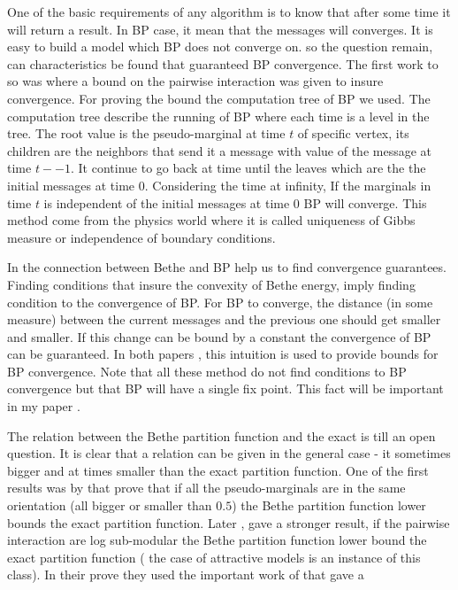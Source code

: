 One of the basic requirements of any algorithm is to know that after some time it will return a result.
In BP case, it mean that the messages will converges.
It is easy to build a model which BP does not converge on.
so the question remain, can characteristics be found that guaranteed BP convergence.
The first work to so was \cite{tatikonda2002loopy} where a bound on the pairwise interaction was given to insure convergence.
For proving the bound the computation tree of BP we used.
The computation tree describe the running of BP where each time is a level in the tree.
The root value is the pseudo-marginal at time $t$ of specific vertex, its children are the neighbors that  send it a message with value of the message at time $t--1$.
It continue to go back at time until the leaves which are the  the initial messages at time $0$.
Considering the time at infinity, If the marginals in time $t$ is independent of the initial messages at time $0$ BP will converge.
This method come from the physics world where it is called uniqueness of Gibbs measure or independence of boundary conditions.

In \cite{heskes2004uniqueness} the connection between Bethe and BP help us to find convergence guarantees.
Finding conditions that insure the convexity of Bethe energy, imply finding condition to the convergence of BP. 
For BP to converge,  the distance (in some measure) between the current messages and the previous one should get smaller and smaller.
If this change can be bound by a constant the convergence of BP can be guaranteed.
In both papers \cite{mooij2007sufficient}, \cite{roosta2008convergence} this intuition is used to provide bounds for BP convergence.
Note that all these method do not find conditions to BP convergence but that BP will have a single fix point.
This fact will be important in my paper \cite{heinemann2012cannot}.

The relation between the Bethe partition function and the exact is till an open question.
It is clear that a relation can be given in the general case - it sometimes bigger and at times smaller than the exact partition function.
One of the first results was by \cite{AlanNips2007} that prove that if all the pseudo-marginals are in the same orientation (all bigger or smaller than $0.5$) the Bethe partition function lower bounds the exact partition function.
Later \cite{RuozziNips2012},  gave a stronger result, if the pairwise interaction are log sub-modular the Bethe partition function lower bound the exact partition function ( the case of attractive models is an instance of this class).
In their prove   they used the important work of \cite{vontobel2013counting} that gave a 


